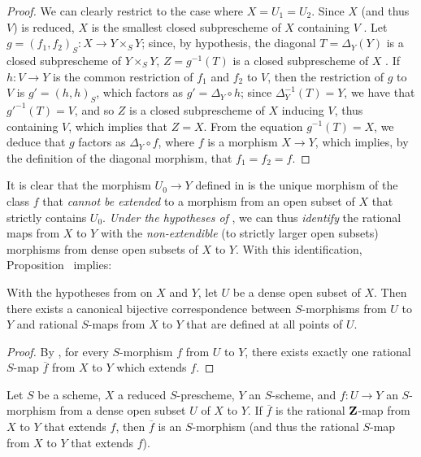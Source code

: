 \begin{proof}
We can clearly restrict to the case where $X=U_1=U_2$.
Since $X$ (and thus $V$) is reduced, $X$ is the smallest closed subprescheme of $X$ containing $V$ .
Let $g=(f_1,f_2)_S:X\to Y\times_S Y$; since, by hypothesis, the diagonal $T=\Delta_Y(Y)$ is a closed subprescheme of $Y\times_S Y$, $Z=g^{-1}(T)$ is a closed subprescheme of $X$ .
If $h:V\to Y$ is the common restriction of $f_1$ and $f_2$ to $V$, then the restriction of $g$ to $V$ is $g'=(h,h)_S$, which factors as $g'=\Delta_Y\circ h$; since $\Delta_Y^{-1}(T)=Y$, we have that $g'^{-1}(T)=V$, and so $Z$ is a closed subprescheme of $X$ inducing $V$, thus containing $V$, which implies that $Z=X$.
From the equation $g^{-1}(T)=X$, we deduce  that $g$ factors as $\Delta_Y\circ f$, where $f$ is a morphism $X\to Y$, which implies, by the definition of the diagonal morphism, that $f_1=f_2=f$.
\end{proof}

It is clear that the morphism $U_0\to Y$ defined in  is the unique morphism of the class $f$ that \emph{cannot be extended} to a morphism from an open subset of $X$ that strictly contains $U_0$.
\emph{Under the hypotheses of }, we can thus \emph{identify} the rational maps from $X$ to $Y$ with the \emph{non-extendible} (to strictly larger open subsets) morphisms from dense open subsets of $X$ to $Y$.
With this identification, Proposition~ implies:
\begin{corollary}[7.2.3]
\label{I.7.2.3}
With the hypotheses from  on $X$ and $Y$, let $U$ be a dense open subset of $X$.
Then there exists a canonical bijective correspondence between $S$-morphisms from $U$ to $Y$ and rational $S$-maps from $X$ to $Y$ that are defined at all points of $U$.
\end{corollary}

\begin{proof}
By , for every $S$-morphism $f$ from $U$ to $Y$, there exists exactly one rational $S$-map $\overline{f}$ from $X$ to $Y$ which extends $f$.
\end{proof}

\begin{corollary}[7.2.4]
\label{I.7.2.4}
Let $S$ be a scheme, $X$ a reduced $S$-prescheme, $Y$ an $S$-scheme, and $f:U\to Y$ an $S$-morphism from a dense open subset $U$ of $X$ to $Y$.
If $\overline{f}$ is the rational $\mathbf{Z}$-map from $X$ to $Y$ that extends $f$, then $\overline{f}$ is an $S$-morphism (and thus the rational $S$-map from $X$ to $Y$ that extends $f$).
\end{corollary}

